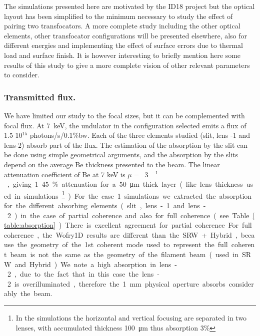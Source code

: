 \documentclass{iucr}              %
\begin{document}
The simulations presented here are motivated by the ID18 project but the optical layout has been simplified to the minimum necessary to study the effect of pairing two transfocators. A more complete study including the other optical elements, other transfocator configurations will be presented elsewhere, also for different energies and implementing the effect of surface errors due to thermal load and surface finish. It is however interesting to briefly mention here some results of this study to give a more complete vision of other relevant parameters to consider.

\subsubsection{Transmitted flux.} We have limited our study to the focal sizes, but it can be complemented with focal flux. At \SI{7}{keV}, the undulator in the configuration selected emits a flux of 1.5 10$^{15}$ photons/s/0.1\%bw. Each of the three elements studied (slit, lens -1 and lens-2) absorb part of the flux. The estimation of the absorption by the slit can be done using simple geometrical arguments, and the absorption by the slits depend on the average Be thickness presented to the beam. The linear attenuation coefficient of Be at 7 keV is $\mu=$~\SI{3}{\centi\meter$^{-1}$}, giving 1.45\% attenuation for a \SI{50}{\micro\meter} thick layer (like lens thickness used in simulations\footnote{In the simulations the horizontal and vertical focusing are separated in two lenses, with accumulated thickness \SI{100}{\micro\meter} thus absorption 3\%}). For the case 1 simulations we extracted the absorption for the different absorbing elements (slit, lens-1 and lens-2) in the case of partial coherence and also for full coherence (see Table~\ref{table:absorption}).

There is excellent agreement for partial coherence. For full coherence, the Wofry1D results are different than the SRW+Hybrid, because the geometry of the 1st coherent mode used to represent the full coherent beam is not the same as the geometry of the filament beam (used in SRW and Hybrid). We note a high absorption in lens-2, due to the fact that in this case the lens-2 is overilluminated, therefore the \SI{1}{\milli\meter} physical aperture absorbs considerably the beam.


\end{document}
